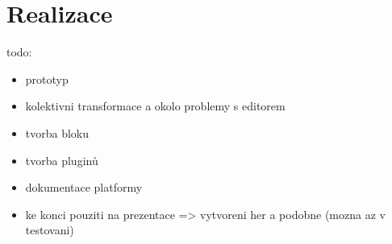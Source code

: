 \chapter{Realizace}

todo:

\begin{itemize}
    \item prototyp
    \item kolektivni transformace a okolo problemy s editorem
    \item tvorba bloku
    \item tvorba pluginů
    \item dokumentace platformy
    \item ke konci pouziti na prezentace => vytvoreni her a podobne (mozna az v testovani)
\end{itemize}